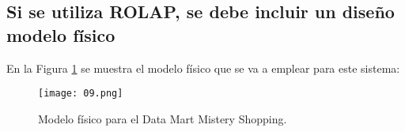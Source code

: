 \medskip
\subsection{Si se utiliza ROLAP, se debe incluir un diseño modelo físico}
\label{09}
En la Figura \ref{09-image} se muestra el modelo físico que se va a emplear para este sistema:

\begin{figure}[!th]
\texttt{[image: 09.png]}
\centering
\caption{Modelo físico para el Data Mart Mistery Shopping.}
\label{09-image}
\end{figure}

